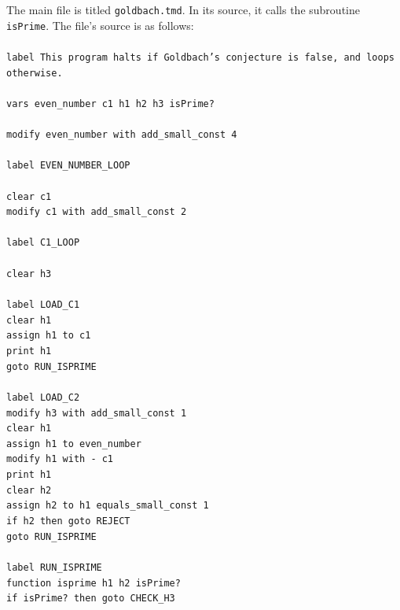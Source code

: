 \documentclass[11pt]{report}
\begin{document}
The main file is titled \texttt{goldbach.tmd}. In its source, it calls the subroutine \texttt{isPrime}. The file's source is as follows: \\ \\
{\tt label This program halts if Goldbach's conjecture is false, and loops otherwise. \\ \\
vars even\_number c1 h1 h2 h3 isPrime? \\ \\
modify even\_number with add\_small\_const 4 \\ \\
label EVEN\_NUMBER\_LOOP \\ \\ 
\indent	clear c1 \\ 
\indent	modify c1 with add\_small\_const 2 \\ \\
\indent	label C1\_LOOP \\ \\
\indent \indent	clear h3 \\ \\		
\indent \indent	label LOAD\_C1 \\
\indent \indent	clear h1 \\
\indent \indent	assign h1 to c1 \\
\indent \indent print h1 \\
\indent \indent	goto RUN\_ISPRIME \\ \\
\indent \indent	label LOAD\_C2 \\
\indent \indent	modify h3 with add\_small\_const 1 \\
\indent \indent	clear h1 \\
\indent \indent	assign h1 to even\_number \\
\indent \indent	modify h1 with - c1 \\
\indent \indent	print h1 \\
\indent \indent	clear h2 \\
\indent \indent	assign h2 to h1 equals\_small\_const 1 \\
\indent \indent	if h2 then goto REJECT \\
\indent \indent	goto RUN\_ISPRIME \\ \\
\indent \indent	label RUN\_ISPRIME \\
\indent \indent	function isprime h1 h2 isPrime? \\
\indent \indent	if isPrime? then goto CHECK\_H3 \\
}
\end{document}
